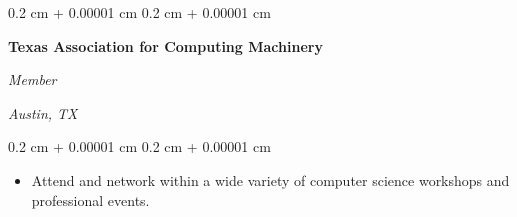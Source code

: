 \documentclass[10pt, letterpaper]{article}
\newenvironment{highlights}{
    \begin{itemize}[
        topsep=0.10 cm,
        parsep=0.10 cm,
        partopsep=0pt,
        itemsep=0pt,
        leftmargin=0.4 cm + 10pt
    ]
}{
    \end{itemize}
} %
\newenvironment{onecolentry}{
    \begin{adjustwidth}{
        0.2 cm + 0.00001 cm
    }{
        0.2 cm + 0.00001 cm
    }
}{
    \end{adjustwidth}
} %
\newenvironment{twocolentry}[2][]{
    \onecolentry
    \def\secondColumn{#2}
    \setcolumnwidth{\fill, 4.5 cm}
    \begin{paracol}{2}
}{
    \switchcolumn \raggedleft \secondColumn
    \end{paracol}
    \endonecolentry
} %
\begin{document}
        \vspace{0.2 cm}

        \begin{twocolentry}{
        \textit{Austin, TX}    
            
        }
            \textbf{Texas Association for Computing Machinery}
            
            \textit{Member}
        \end{twocolentry}

        \vspace{0.10 cm}
        \begin{onecolentry}
            \begin{highlights}
                \item Attend and network within a wide variety of computer science workshops and professional events.
            \end{highlights}
        \end{onecolentry}



    
\end{document}
